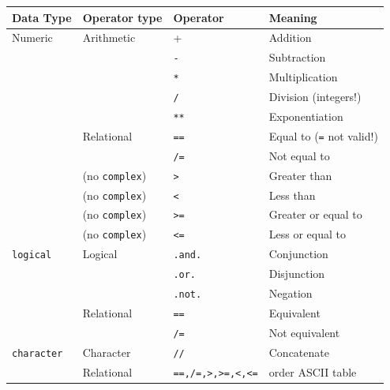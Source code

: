 \begin{table}[!h]
    \centering
    \begin{tabular}{|l|l|l|l|}
        \hline
        Data Type  & Operator type & Operator & Meaning \\ \hline
        Numeric & Arithmetic & + & Addition \\ 
        ~ & ~ & \texttt{-} & Subtraction \\ 
        ~ & ~ & \texttt{*} & Multiplication \\ 
        ~ & ~ & \texttt{/} & Division (integers!) \\ 
        ~ & ~ & \texttt{**} & Exponentiation \\ 
        ~ & Relational & \texttt{==}   & Equal to (\texttt{=} not valid!) \\ 
        ~ & ~ & \texttt{/=}   & Not equal to \\ 
        ~ & {\footnotesize (no \texttt{complex})} & \texttt{>}   & Greater than  \\ 
        ~ & {\footnotesize (no \texttt{complex})} & \texttt{<}  & Less than \\ 
        ~ & {\footnotesize (no \texttt{complex})} & \texttt{>=} & Greater or equal to \\ 
        ~ & {\footnotesize (no \texttt{complex})} & \texttt{<=}   & Less or equal to  \\ \hline
        \texttt{logical} & Logical & \texttt{.and.} & Conjunction \\ 
        ~ & ~ & \texttt{.or.} & Disjunction \\ 
        ~ & ~ & \texttt{.not.} & Negation \\ 
        ~ & Relational &\texttt{==}  & Equivalent \\ 
        ~ & ~ & \texttt{/=}   & Not equivalent \\ \hline
        \texttt{character} & Character & \texttt{//} & Concatenate \\ 
        ~ & Relational & \texttt{==,/=,>,>=,<,<=} & order ASCII table \\ \hline
    \end{tabular}
\end{table}




        \newpage 

